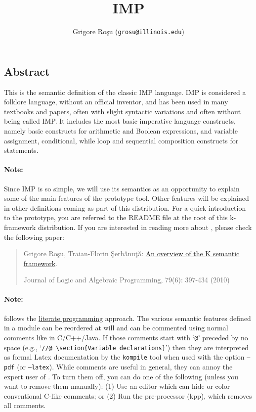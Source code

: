 \setlength{\parindent}{1em}
\title{IMP}
\author{Grigore Ro\c{s}u (\texttt{grosu@illinois.edu})}

\maketitle

\begin{latexComment}
\section{Abstract}
This is the \K semantic definition of the classic IMP language.
IMP is considered a folklore language, without an official inventor,
and has been used in many textbooks and papers, often with slight
syntactic variations and often without being called IMP\@.  It includes
the most basic imperative language constructs, namely basic constructs
for arithmetic and Boolean expressions, and variable assignment,
conditional, while loop and sequential composition constructs for statements.

\paragraph{Note:}{
Since IMP is so simple, we will use its semantics as an opportunity to
explain some of the main features of the \K  prototype tool.  Other
features will be explained in other \K definitions coming as part of
this distribution.  For a quick introduction to the \K prototype, you
are referred to the README file at the root of this k-framework
distribution.  If you are interested in reading more about \K, please
check the following paper:
\begin{quote}
Grigore Ro\c su, Traian-Florin \c Serb\u anu\c t\u a:
\href{http://dx.doi.org/10.1016/j.jlap.2010.03.012}
     {An overview of the K semantic framework}.

Journal of Logic and Algebraic Programming, 79(6): 397-434 (2010)
\end{quote}
}

\paragraph{Note:}{
\K follows the
\href{https://en.wikipedia.org/wiki/Literate_programming}{literate
programming} approach.  The various semantic features defined in a \K
module can be reordered at will and can be commented using normal
comments like in C/C++/Java.  If those comments start with
`\texttt{@}' preceded by no space (e.g.,
`\texttt{//@ {\textbackslash}section\{Variable declarations\}}')
then they are interpreted as formal Latex documentation by the
\texttt{kompile} tool when used with the option \texttt{--pdf}
(or \texttt{--latex}).
While comments are useful in general, they can annoy the expert user
of \K.  To turn them off, you can do one of the following (unless you
want to remove them manually): (1) Use an editor which can hide or
color conventional C-like comments; or (2) Run the \K pre-processor
(kpp), which removes all comments.
}


\end{latexComment}
